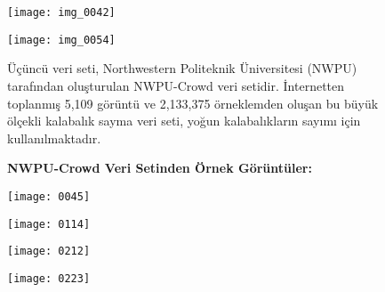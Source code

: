 \documentclass[10pt,a4paper]{report}
\begin{document}
\begin{justify}
\begin{landscape}
\begin{figure}[!h]
		
		
		\begin{minipage}[b]{0.395\linewidth}
			\centering
			\texttt{[image: img\_0042]}
			\caption{\cite{idrees2018composition}}
		\end{minipage}\hfill
		\begin{minipage}[b]{0.395\linewidth}
			\centering
			\texttt{[image: img\_0054]}
			\caption{\cite{idrees2018composition}}
		\end{minipage}
		
	\end{figure}
	
\end{landscape}
	\clearpage
\begin{landscape} %
	
	
	\begin{figure}[!h] %
		\begin{justify}
				Üçüncü veri seti, Northwestern Politeknik Üniversitesi (NWPU) tarafından oluşturulan NWPU-Crowd veri setidir. İnternetten toplanmış 5,109 görüntü ve 2,133,375 örneklemden oluşan bu büyük ölçekli kalabalık sayma veri seti, yoğun kalabalıkların sayımı için kullanılmaktadır.\newline
			
			\textbf{NWPU-Crowd Veri Setinden Örnek Görüntüler:}
		\end{justify}

		
		\begin{minipage}[t]{0.405\linewidth}
			\centering
			\texttt{[image: 0045]}
			\caption{\cite{idrees2018composition}}
		\end{minipage}\hfill
		\begin{minipage}[t]{0.395\linewidth}
			\centering
			\texttt{[image: 0114]}
			\caption{\cite{idrees2018composition}}
		\end{minipage}
		
		
		
		\begin{minipage}[b]{0.395\linewidth}
			\centering
			\texttt{[image: 0212]}
			\caption{\cite{gao2020nwpu}}
		\end{minipage}\hfill
		\begin{minipage}[b]{0.395\linewidth}
			\centering
			\texttt{[image: 0223]}
			\caption{\cite{gao2020nwpu}}
		\end{minipage}
		
	\end{figure}
	
\end{landscape}
\end{justify}
\end{document}
